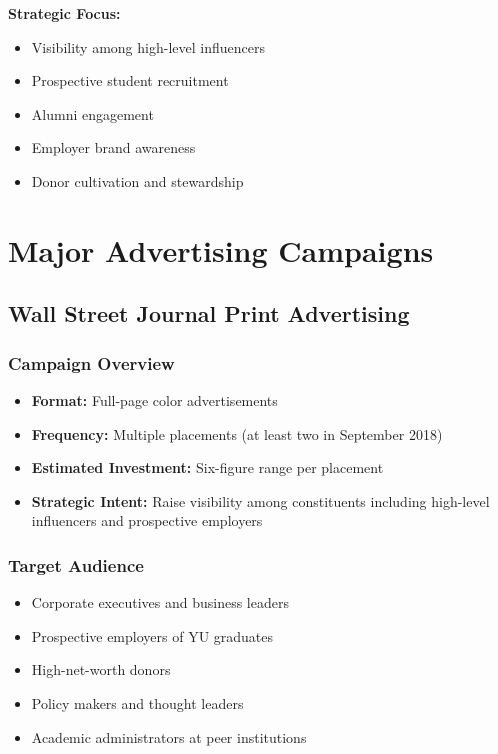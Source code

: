 \documentclass[12pt,letterpaper]{article}
\begin{document}
\textbf{Strategic Focus:}
\begin{itemize}[leftmargin=*]
    \item Visibility among high-level influencers
    \item Prospective student recruitment
    \item Alumni engagement
    \item Employer brand awareness
    \item Donor cultivation and stewardship
\end{itemize}

\section{Major Advertising Campaigns}

\subsection{Wall Street Journal Print Advertising}

\subsubsection{Campaign Overview}
\begin{itemize}[leftmargin=*]
    \item \textbf{Format:} Full-page color advertisements
    \item \textbf{Frequency:} Multiple placements (at least two in September 2018)
    \item \textbf{Estimated Investment:} Six-figure range per placement
    \item \textbf{Strategic Intent:} Raise visibility among constituents including high-level influencers and prospective employers
\end{itemize}

\subsubsection{Target Audience}
\begin{itemize}[leftmargin=*]
    \item Corporate executives and business leaders
    \item Prospective employers of YU graduates
    \item High-net-worth donors
    \item Policy makers and thought leaders
    \item Academic administrators at peer institutions
\end{itemize}
\end{document}
